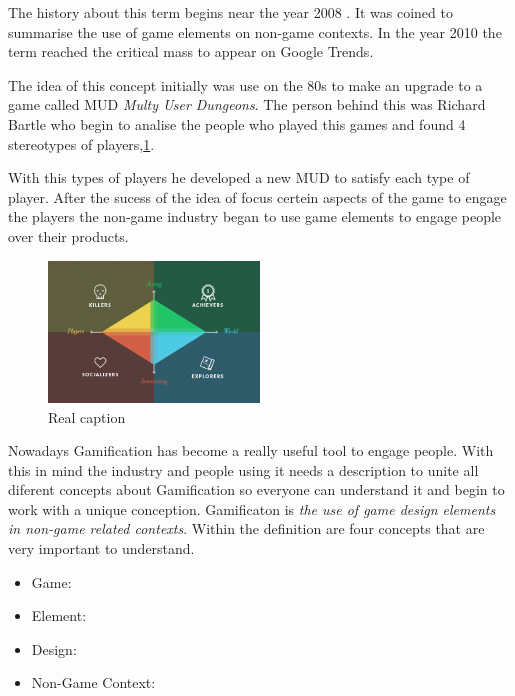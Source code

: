 The history about this term begins near the year 2008 \cite{DefineGamefication}. 
It was coined to summarise the use of game elements on non-game contexts.
In the year 2010 the term reached the critical mass to appear on Google
Trends\cite{LiCap1.3}.

The idea of this concept initially was use on the 80s to make an upgrade to a 
game called MUD \emph{Multy User Dungeons}. The person behind this was Richard Bartle
who begin to analise the people who played this games and found 4 stereotypes of
players,\ref{fig:Players}.

With this types of players he developed a new MUD to satisfy each type of player.
After the sucess of the idea of focus certein aspects of the game to engage the players
the non-game industry began to use game elements to engage people over their products. 

\begin{figure}[!htb]
  \centering
  \includegraphics[width=0.5\textwidth]{images/TypeOfPlayersBartle.png}
  \caption[Caption for LOF]{Real caption\footnotemark}
  \label{fig:Players}
\end{figure}

 	


Nowadays Gamification has become a really useful tool to engage people. With this in mind
the industry and people using it needs a description to unite all diferent concepts
about Gamification so everyone can understand it and begin to work with a unique conception.
Gamificaton is \emph{the use of game design elements in non-game related contexts}. 
Within the definition are four concepts that are very important to understand.

\begin{itemize}

\item Game:

\item Element:

\item Design:

\item Non-Game Context:

\end{itemize}

